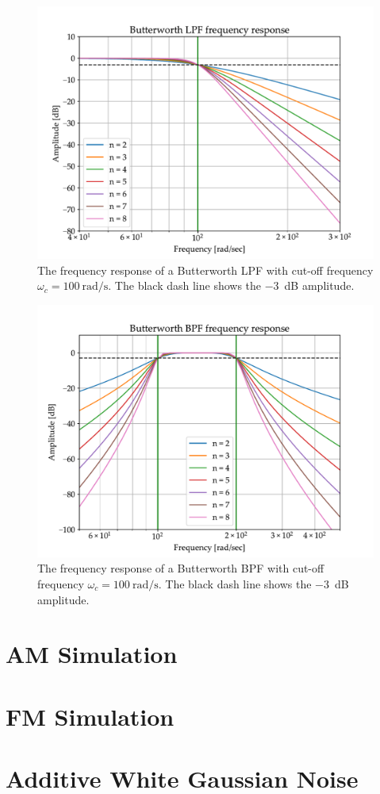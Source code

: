 \documentclass[../ECE459FinalProjectReport.tex]{subfiles}
\begin{document}
\begin{figure}[b]
    \centering
    \includegraphics[scale=0.7]{plots/butterworth-lpf.pdf}
    \caption{The frequency response of a Butterworth LPF with cut-off frequency $\omega_c = \SI{100}{\radian\per\s}$. The black dash line shows the \SI{-3}{\dB} amplitude.}
    \label{fig:butter-lpf}
\end{figure}

\begin{figure}[b]
    \centering
    \includegraphics[scale=0.7]{plots/butterworth-bpf.pdf}
    \caption{The frequency response of a Butterworth BPF with cut-off frequency $\omega_c = \SI{100}{\radian\per\s}$. The black dash line shows the \SI{-3}{\dB} amplitude.}
    \label{fig:butter-bpf}
\end{figure}

\section{AM Simulation}

\section{FM Simulation}

\section{Additive White Gaussian Noise}
\end{document}
